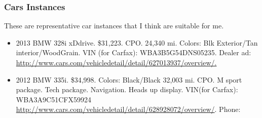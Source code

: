 \begin{frame}
\frametitle{Cars Instances}  
{\tiny These are representative car instances that I think are
  suitable for me.} 
\begin{itemize} 
\small \item \small  2013 BMW 328i xDdrive. \$31,223. CPO. 24,340 mi. Colors: Blk
Exterior/Tan interior/WoodGrain. VIN (for Carfax):
WBA3B5G54DNS05235. Dealer ad: \url{http://www.cars.com/vehicledetail/detail/627013937/overview/.}
\item \small 2012 BMW 335i. \$34,998. Colors: Black/Black 32,003
  mi. CPO. M sport package. Tech package. Navigation. Heads up display. VIN(for
  Carfax):  WBA3A9C51CFX59924
  \url{http://www.cars.com/vehicledetail/detail/628928072/overview/}. Phone: 
\end{itemize}
\end{frame}

